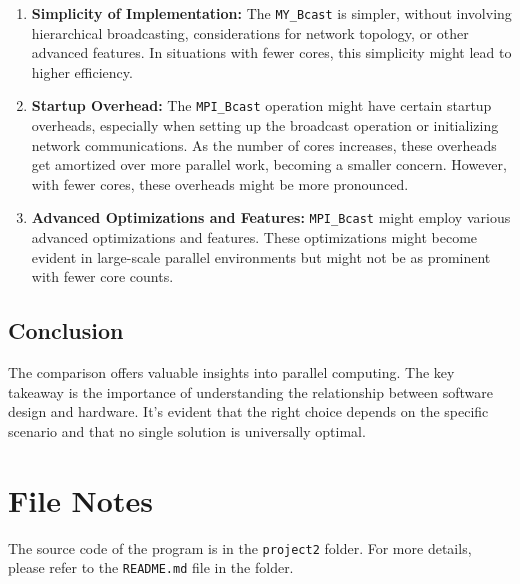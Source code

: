 \documentclass[12pt,a4paper]{article}
\begin{document}
\begin{enumerate}
    \item \textbf{Simplicity of Implementation:} The \texttt{MY\_Bcast} is simpler, without involving hierarchical broadcasting, considerations for network topology, or other advanced features. In situations with fewer cores, this simplicity might lead to higher efficiency.
    
    \item \textbf{Startup Overhead:} The \texttt{MPI\_Bcast} operation might have certain startup overheads, especially when setting up the broadcast operation or initializing network communications. As the number of cores increases, these overheads get amortized over more parallel work, becoming a smaller concern. However, with fewer cores, these overheads might be more pronounced.
    
    \item \textbf{Advanced Optimizations and Features:} \texttt{MPI\_Bcast} might employ various advanced optimizations and features. These optimizations might become evident in large-scale parallel environments but might not be as prominent with fewer core counts.
\end{enumerate}


\subsection{Conclusion}
The comparison offers valuable insights into parallel computing. 
The key takeaway is the importance of understanding the relationship between software design and hardware. 
It's evident that the right choice depends on the specific scenario and that no single solution is universally optimal. 

\section*{File Notes}
The source code of the program is in the \texttt{project2} folder. 
For more details, please refer to the \texttt{README.md} file in the folder.
\end{document}
